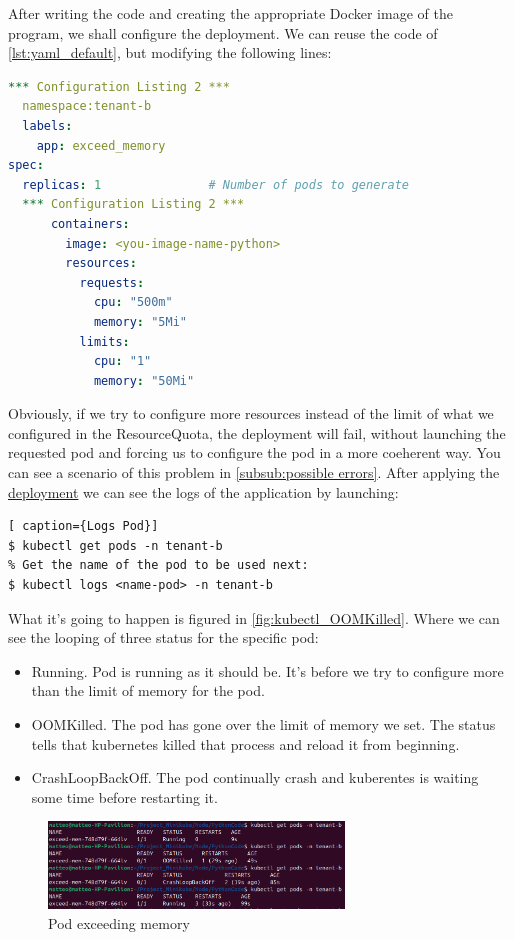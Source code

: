 After writing the code and creating the appropriate Docker image of the program, we shall configure the deployment. We can reuse the code of \autoref{lst:yaml_default}, but modifying the following lines:
\begin{lstlisting}[language=yaml, caption={Deployment exceeding memory application}]
*** Configuration Listing 2 ***
  namespace:tenant-b
  labels:
    app: exceed_memory
spec:
  replicas: 1               # Number of pods to generate
  *** Configuration Listing 2 ***
      containers:
        image: <you-image-name-python>
        resources:
          requests:
            cpu: "500m" 
            memory: "5Mi" 
          limits:
            cpu: "1"
            memory: "50Mi"
\end{lstlisting}
Obviously, if we try to configure more resources instead of the limit of what we configured in the ResourceQuota, the deployment will fail, without launching the requested pod and forcing us to configure the pod in a more coeherent way. You can see a scenario of this problem in \autoref{subsub:possible errors}. After applying the \hyperref[lst:yaml_default]{deployment} we can see the logs of the application by launching:
\begin{lstlisting}[ caption={Logs Pod}]
$ kubectl get pods -n tenant-b
% Get the name of the pod to be used next:
$ kubectl logs <name-pod> -n tenant-b
\end{lstlisting}
What it's going to happen is figured in \autoref{fig:kubectl_OOMKilled}. Where we can see the looping of three status for the specific pod:
\begin{itemize}
    \item Running. Pod is running as it should be. It's before we try to configure more than the limit of memory for the pod.
    \item OOMKilled. The pod has gone over the limit of memory we set. The status tells that kubernetes killed that process and reload it from beginning. 
    \item CrashLoopBackOff. The pod continually crash and kuberentes is waiting some time before restarting it.
\end{itemize}
\begin{figure}[h!]
    \centering
    \includegraphics[width=0.7\textwidth]{images/OOMKilled_exceed_memory.png}
    \caption{Pod exceeding memory}
    \label{fig:kubectl_OOMKilled}
\end{figure} 
